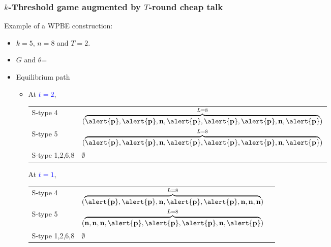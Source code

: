 \documentclass[8pt]{beamer}
\begin{document}
\begin{frame}
  \frametitle{$k$-Threshold game augmented by $T$-round cheap talk}
Example of a WPBE construction:
\begin{itemize}
\item $k=5$, $n=8$ and $T=2$.
\item $G$ and $\theta$=
\begin{center}
\end{center}
\end{itemize}

\begin{itemize}
\item Equilibrium path
\begin{itemize}
\item 
{}
{
At \textcolor{blue}{$t=2$}, 
\begin{table}[h]
\begin{tabular}{ll }
S-type 4 & $(\overbrace{\alert{\textbf{p}},\alert{\textbf{p}},\textbf{n},\alert{\textbf{p}},\alert{\textbf{p}},\alert{\textbf{p}},\textbf{n},\alert{\textbf{p}}}^{L=8})$\\
S-type 5 & $(\overbrace{\alert{\textbf{p}},\alert{\textbf{p}},\textbf{n},\alert{\textbf{p}},\alert{\textbf{p}},\alert{\textbf{p}},\textbf{n},\alert{\textbf{p}}}^{L=8})$\\
S-type 1,2,6,8 & $\emptyset$
\end{tabular}
\end{table}
}
{
At \textcolor{blue}{$t=1$}, 
\begin{table}[h]
\begin{tabular}{ll l}
S-type 4 & $(\overbrace{\alert{\textbf{p}},\alert{\textbf{p}},\textbf{n},\alert{\textbf{p}},\alert{\textbf{p}},\textbf{n},\textbf{n},\textbf{n}}^{L=8})$\\
S-type 5 & $(\overbrace{\textbf{n},\textbf{n},\textbf{n},\alert{\textbf{p}},\alert{\textbf{p}},\alert{\textbf{p}},\textbf{n},\alert{\textbf{p}}}^{L=8})$ \\
S-type 1,2,6,8 & $\emptyset$
\end{tabular}
\end{table}
}


\end{itemize}
\end{itemize}
\end{frame}
\end{document}
